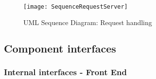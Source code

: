 \begin{landscape}
\begin{figure}[]
        \centering
        \texttt{[image: SequenceRequestServer]}
        \caption{UML Sequence Diagram: Request handling}
        \label{fig:hendleRequest}
\end{figure}
\end{landscape}

\subsection{Component interfaces}
\subsubsection{Internal interfaces - Front End}

